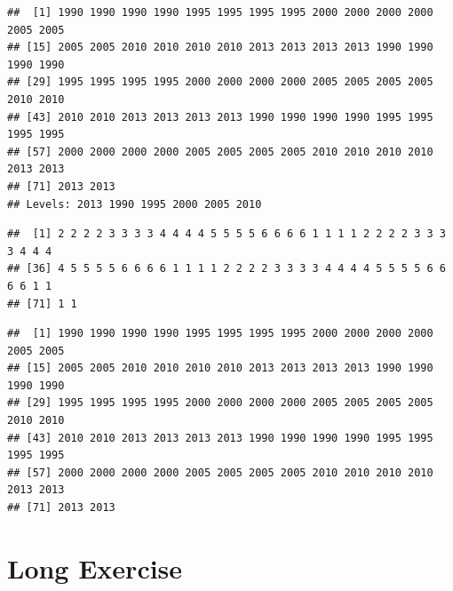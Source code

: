 \documentclass[]{book}
\makeatletter
\newenvironment{Shaded}{\begin{snugshade}}{\end{snugshade}}
\newcommand{\KeywordTok}[1]{\textcolor[rgb]{0.13,0.29,0.53}{\textbf{#1}}}
\newcommand{\StringTok}[1]{\textcolor[rgb]{0.31,0.60,0.02}{#1}}
\newcommand{\OperatorTok}[1]{\textcolor[rgb]{0.81,0.36,0.00}{\textbf{#1}}}
\newcommand{\NormalTok}[1]{#1}
\newenvironment{kframe}{%
\medskip{}
\setlength{\fboxsep}{.8em}
 \def\at@end@of@kframe{}%
 \ifinner\ifhmode%
  \def\at@end@of@kframe{\end{minipage}}%
  \begin{minipage}{\columnwidth}%
 \fi\fi%
 \def\FrameCommand##1{\hskip\@totalleftmargin \hskip-\fboxsep
 \colorbox{shadecolor}{##1}\hskip-\fboxsep
     \hskip-\linewidth \hskip-\@totalleftmargin \hskip\columnwidth}%
 \MakeFramed {\advance\hsize-\width
   \@totalleftmargin\z@ \linewidth\hsize
   \@setminipage}}%
 {\par\unskip\endMakeFramed%
 \at@end@of@kframe}
\renewenvironment{Shaded}{\begin{kframe}}{\end{kframe}}
\makeatother
\begin{document}
\begin{verbatim}
##  [1] 1990 1990 1990 1990 1995 1995 1995 1995 2000 2000 2000 2000 2005 2005
## [15] 2005 2005 2010 2010 2010 2010 2013 2013 2013 2013 1990 1990 1990 1990
## [29] 1995 1995 1995 1995 2000 2000 2000 2000 2005 2005 2005 2005 2010 2010
## [43] 2010 2010 2013 2013 2013 2013 1990 1990 1990 1990 1995 1995 1995 1995
## [57] 2000 2000 2000 2000 2005 2005 2005 2005 2010 2010 2010 2010 2013 2013
## [71] 2013 2013
## Levels: 2013 1990 1995 2000 2005 2010
\end{verbatim}

\begin{Shaded}
\end{Shaded}

\begin{verbatim}
##  [1] 2 2 2 2 3 3 3 3 4 4 4 4 5 5 5 5 6 6 6 6 1 1 1 1 2 2 2 2 3 3 3 3 4 4 4
## [36] 4 5 5 5 5 6 6 6 6 1 1 1 1 2 2 2 2 3 3 3 3 4 4 4 4 5 5 5 5 6 6 6 6 1 1
## [71] 1 1
\end{verbatim}

\begin{Shaded}
\end{Shaded}

\begin{verbatim}
##  [1] 1990 1990 1990 1990 1995 1995 1995 1995 2000 2000 2000 2000 2005 2005
## [15] 2005 2005 2010 2010 2010 2010 2013 2013 2013 2013 1990 1990 1990 1990
## [29] 1995 1995 1995 1995 2000 2000 2000 2000 2005 2005 2005 2005 2010 2010
## [43] 2010 2010 2013 2013 2013 2013 1990 1990 1990 1990 1995 1995 1995 1995
## [57] 2000 2000 2000 2000 2005 2005 2005 2005 2010 2010 2010 2010 2013 2013
## [71] 2013 2013
\end{verbatim}

\newpage 

\section{Long Exercise}\label{long-exercise}
\end{document}

